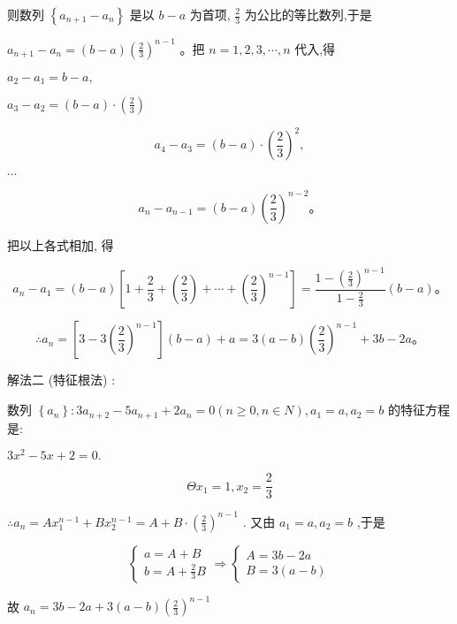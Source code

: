 \documentclass[10pt,cn]{elegantbook}
\begin{document}
则数列 \(\left\{ {{a}_{n + 1} - {a}_{n}}\right\}\) 是以 \(b - a\) 为首项, \(\frac{2}{3}\) 为公比的等比数列,于是

\({a}_{n + 1} - {a}_{n} = \left( {b - a}\right) {\left( \frac{2}{3}\right) }^{n - 1}\) 。把 \(n = 1,2,3,\cdots ,n\) 代入,得

\({a}_{2} - {a}_{1} = b - a,\)

\({a}_{3} - {a}_{2} = \left( {b - a}\right) \cdot \left( \frac{2}{3}\right)\)

\[
{a}_{4} - {a}_{3} = \left( {b - a}\right) \cdot {\left( \frac{2}{3}\right) }^{2},
\]

\(\cdots\)

\[
{a}_{n} - {a}_{n - 1} = \left( {b - a}\right) {\left( \frac{2}{3}\right) }^{n - 2}\text{。}
\]

把以上各式相加, 得

\[
{a}_{n} - {a}_{1} = \left( {b - a}\right) \left\lbrack {1 + \frac{2}{3} + \left( \frac{2}{3}\right) + \cdots + {\left( \frac{2}{3}\right) }^{n - 1}}\right\rbrack = \frac{1 - {\left( \frac{2}{3}\right) }^{n - 1}}{1 - \frac{2}{3}}\left( {b - a}\right) \text{。}
\]

\[
\therefore {a}_{n} = \left\lbrack {3 - 3{\left( \frac{2}{3}\right) }^{n - 1}}\right\rbrack \left( {b - a}\right) + a = 3\left( {a - b}\right) {\left( \frac{2}{3}\right) }^{n - 1} + {3b} - {2a}\text{。}
\]

解法二 (特征根法) :

数列 \(\left\{ {a}_{n}\right\} : 3{a}_{n + 2} - 5{a}_{n + 1} + 2{a}_{n} = 0\left( {n \geq 0,n \in N}\right) ,{a}_{1} = a,{a}_{2} = b\) 的特征方程是:

\(3{x}^{2} - {5x} + 2 = 0.\)

\[
\Theta {x}_{1} = 1,{x}_{2} = \frac{2}{3}
\]

\(\therefore {a}_{n} = A{x}_{1}^{n - 1} + B{x}_{2}^{n - 1} = A + B \cdot {\left( \frac{2}{3}\right) }^{n - 1}\) . 又由 \({a}_{1} = a,{a}_{2} = b\) ,于是

\[
\left\{ {\begin{array}{l} a = A + B \\ b = A + \frac{2}{3}B \end{array} \Rightarrow \left\{ \begin{array}{l} A = {3b} - {2a} \\ B = 3\left( {a - b}\right) \end{array}\right. }\right.
\]

故 \({a}_{n} = {3b} - {2a} + 3\left( {a - b}\right) {\left( \frac{2}{3}\right) }^{n - 1}\)
\end{document}
